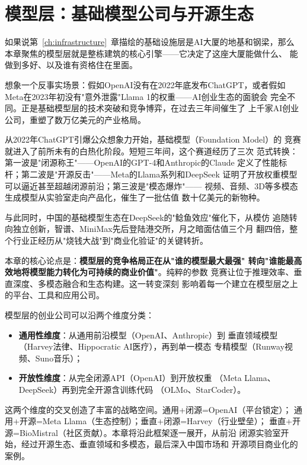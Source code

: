
\chapter{模型层：基础模型公司与开源生态}
\label{ch:models}

如果说第~\ref{ch:infrastructure}~章描绘的基础设施层是AI大厦的地基和钢梁，那么
本章聚焦的模型层就是整栋建筑的核心引擎——它决定了这座大厦能做什么、
能做到多好、以及谁有资格住在里面。

想象一个反事实场景：假如OpenAI没有在2022年底发布ChatGPT，或者假如
Meta在2023年初没有"意外泄露"Llama 1的权重——AI创业生态的面貌会
完全不同。正是基础模型层的技术突破和竞争博弈，在过去三年间催生了
上千家AI创业公司，重塑了数万亿美元的产业格局。

从2022年ChatGPT引爆公众想象力开始，基础模型（Foundation Model）的
竞赛就进入了前所未有的白热化阶段。短短三年间，这个赛道经历了三次
范式转换：第一波是"闭源称王"——OpenAI的GPT-4和Anthropic的Claude
定义了性能标杆；第二波是"开源反击"——Meta的Llama系列和DeepSeek
证明了开放权重模型可以逼近甚至超越闭源前沿；第三波是"模态爆炸"——
视频、音频、3D等多模态生成模型从实验室走向产品化，催生了一批估值
数十亿美元的新物种。

与此同时，中国的基础模型生态在DeepSeek的"鲶鱼效应"催化下，从模仿
追随转向独立创新，智谱、MiniMax先后登陆港交所，月之暗面估值三个月
翻四倍，整个行业正经历从"烧钱大战"到"商业化验证"的关键转折。

本章的核心论点是：\textbf{模型层的竞争格局正在从"谁的模型最大最强"
转向"谁能最高效地将模型能力转化为可持续的商业价值"}。纯粹的参数
竞赛让位于推理效率、垂直深度、多模态融合和生态构建。这一转变深刻
影响着每一个建立在模型层之上的平台、工具和应用公司。

\begin{corebox}[模型层公司分类框架]
模型层的创业公司可以沿两个维度分类：
\begin{itemize}
  \item \textbf{通用性维度}：从通用前沿模型（OpenAI、Anthropic）到
    垂直领域模型（Harvey法律、Hippocratic AI医疗），再到单一模态
    专精模型（Runway视频、Suno音乐）；
  \item \textbf{开放性维度}：从完全闭源API（OpenAI）到开放权重
   （Meta Llama、DeepSeek）再到完全开源含训练代码
   （OLMo、StarCoder）。
\end{itemize}
这两个维度的交叉创造了丰富的战略空间。通用+闭源=OpenAI（平台锁定）；
通用+开源=Meta Llama（生态控制）；垂直+闭源=Harvey（行业壁垒）；
垂直+开源=BioMistral（社区贡献）。本章将沿此框架逐一展开，从前沿
闭源实验室开始，经过开源生态、垂直领域和多模态，最后深入中国市场和
开源项目商业化的案例。
\end{corebox}

